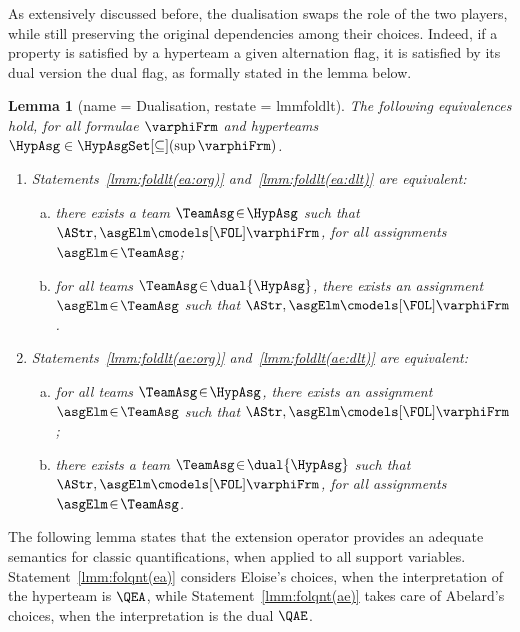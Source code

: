\documentclass[authoryear]{elsarticle}
\newtheorem{lemma}{Lemma}
\begin{document}
As extensively discussed before, the dualisation swaps the role of the two
players, while still preserving the original dependencies among their choices.
Indeed, if a \FOL property is satisfied by a hyperteam \wrt a given alternation
flag, it is satisfied by its dual version \wrt the dual flag, as formally
stated in the lemma below.

\begin{lemma}[name = \FOL Dualisation, restate = lmmfoldlt]
  \label{lmm:foldlt}
  The following equivalences hold, for all \FOL formulae $\varphiFrm$ and
  hyperteams $\HypAsg \in \HypAsgSet[\subseteq](\sup{\varphiFrm})$.
  \begin{enumerate}[1)]
    \item\label{lmm:foldlt(ea)}
      Statements~\ref{lmm:foldlt(ea:org)} and~\ref{lmm:foldlt(ea:dlt)} are
      equivalent:
      \begin{enumerate}[a)]
        \item\label{lmm:foldlt(ea:org)}
          there exists a team $\TeamAsg \!\in\! \HypAsg$ such that $\AStr,
          \asgElm \cmodels[\FOL] \varphiFrm$, for all assignments $\asgElm
          \!\in\! \TeamAsg$;
        \item\label{lmm:foldlt(ea:dlt)}
          for all teams $\TeamAsg \!\in\! \dual{\HypAsg}$, there exists an
          assignment $\asgElm \!\in\! \TeamAsg$ such that $\AStr, \asgElm
          \cmodels[\FOL] \varphiFrm$.
      \end{enumerate}
    \item\label{lmm:foldlt(ae)}
      Statements~\ref{lmm:foldlt(ae:org)} and~\ref{lmm:foldlt(ae:dlt)} are
      equivalent:
      \begin{enumerate}[a)]
        \item\label{lmm:foldlt(ae:org)}
          for all teams $\TeamAsg \!\in\! \HypAsg$, there exists an assignment
          $\asgElm \!\in\! \TeamAsg$ such that $\AStr, \asgElm \cmodels[\FOL]
          \varphiFrm$;\!
        \item\label{lmm:foldlt(ae:dlt)}
          there exists a team $\TeamAsg \!\in\! \dual{\HypAsg}$ such that
          $\AStr, \asgElm \cmodels[\FOL] \varphiFrm$, for all assignments
          $\asgElm \!\in\! \TeamAsg$.
      \end{enumerate}
  \end{enumerate}
\end{lemma}

The following lemma states that the extension operator provides an adequate
semantics for classic \FOL quantifications, when applied to all support
variables.
Statement~\ref{lmm:folqnt(ea)} considers Eloise's choices, when the
interpretation of the hyperteam is $\QEA$, while Statement~\ref{lmm:folqnt(ae)}
takes care of Abelard's choices, when the interpretation is the dual $\QAE$.
\end{document}
